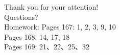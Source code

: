 \documentclass[
10pt,
aspectratio=43,
]{beamer}
\begin{document}
\begin{frame}[plain]
	\vfill
	\centering
	{
		\centering \Huge \color{white} Thank you for your attention!\\[10pt]Questions?\\ Homework: Pages 167: 1, 2, 3, 9, 10\\Pages 168: 14, 17, 18\\Pages 169: 21、22、25、32
	}
	\vfill
\end{frame}
\end{document}
